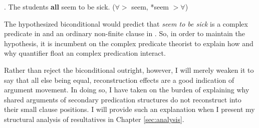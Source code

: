 \documentclass[MilwayThesis]{subfiles}
\begin{document}
\ex. The students \textbf{all} seem to be sick. ($\forall >$ seem, *seem $> \forall$)

The hypothesized biconditional would predict that \textit{seem to be sick} is a complex predicate in \Last and an ordinary non-finite clause in \LLast.
So, in order to maintain the hypothesis, it is incumbent on the complex predicate theorist to explain how and why quantifier float an complex predication interact.

Rather than reject the biconditional outright, however, I will merely weaken it to say that all else being equal, reconstruction effects are a good indication of argument movement.
In doing so, I have taken on the burden of explaining why shared arguments of secondary predication structures do not reconstruct into their small clause positions.
I will provide such an explanation when I present my structural analysis of resultatives in Chapter \ref{sec:analysis}.
\end{document}
